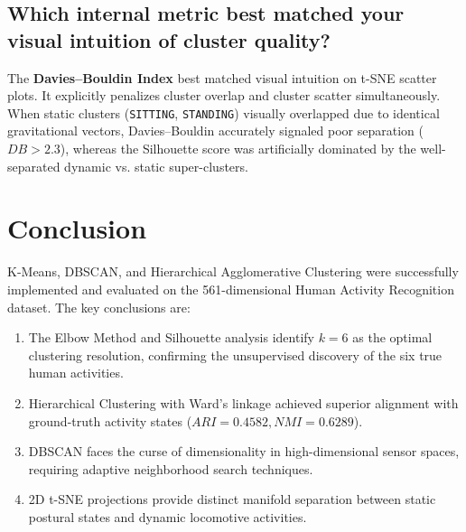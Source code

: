 \documentclass[12pt,a4paper]{article}
\begin{document}
\subsection{Which internal metric best matched your visual intuition of cluster quality?}
The \textbf{Davies--Bouldin Index} best matched visual intuition on t-SNE scatter plots. It explicitly penalizes cluster overlap and cluster scatter simultaneously. When static clusters (\texttt{SITTING}, \texttt{STANDING}) visually overlapped due to identical gravitational vectors, Davies--Bouldin accurately signaled poor separation ($DB > 2.3$), whereas the Silhouette score was artificially dominated by the well-separated dynamic vs. static super-clusters.

\section{Conclusion}
K-Means, DBSCAN, and Hierarchical Agglomerative Clustering were successfully implemented and evaluated on the 561-dimensional Human Activity Recognition dataset.
The key conclusions are:
\begin{enumerate}
\item The Elbow Method and Silhouette analysis identify $k=6$ as the optimal clustering resolution, confirming the unsupervised discovery of the six true human activities.
\item Hierarchical Clustering with Ward's linkage achieved superior alignment with ground-truth activity states ($ARI = 0.4582, NMI = 0.6289$).
\item DBSCAN faces the curse of dimensionality in high-dimensional sensor spaces, requiring adaptive neighborhood search techniques.
\item 2D t-SNE projections provide distinct manifold separation between static postural states and dynamic locomotive activities.
\end{enumerate}
\end{document}
